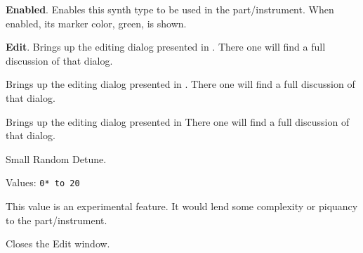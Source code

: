 
   \begin{enumber}
      \item \textbf{Enabled}.
      Enables this synth type to be used in the part/instrument.
      When enabled, its marker color, green, is shown.
      \item \textbf{Edit}.
      Brings up the editing dialog presented in
      .
      There one will find a full discussion of that dialog.
   \end{enumber}

   Brings up the editing dialog presented in
   .
   There one will find a full discussion of that dialog.

   Brings up the editing dialog presented in
   There one will find a full discussion of that dialog.

   Small Random Detune.

   Values: \texttt{0* to 20}

   This value is an experimental feature.  It would lend some complexity or
   piquancy to the part/instrument.

   Closes the Edit window.

